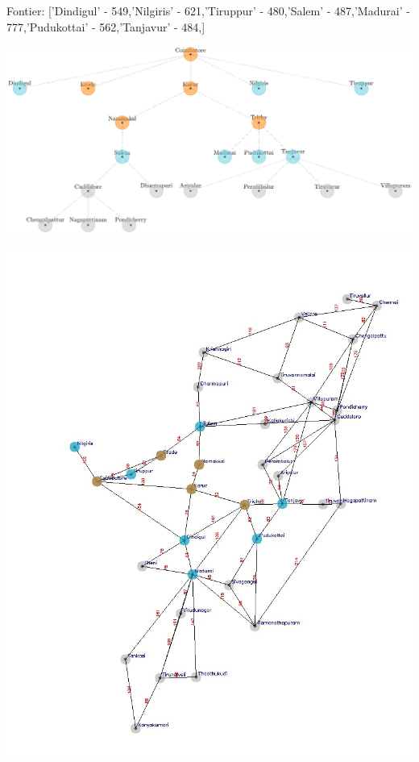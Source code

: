 \documentclass[xcolor=table]{beamer}
\begin{document}
\begin{frame}
  { \tiny Fontier: ['Dindigul' - 549,'Nilgiris' - 621,'Tiruppur' - 480,'Salem' - 487,'Madurai' - 777,'Pudukottai' - 562,'Tanjavur' - 484,]}
  \begin{center}
  \includegraphics[height=0.35\textheight]{../AStarNode/7-1.png}
  \end{center}
  \begin{center}
    \includegraphics[height=0.55\textheight]{../AStaroutput/tamilAStar5.jpg}
  \end{center}
\end{frame}
\end{document}
